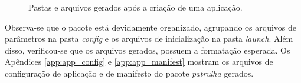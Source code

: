             \begin{figure}[htb]
                \centering
                
                \caption{Pastas e arquivos gerados após a criação de uma aplicação.} \label{fig:patrulha}
            \end{figure}
        
            Observa-se que o pacote está devidamente organizado, agrupando os arquivos de parâmetros na pasta \textit{config} e os arquivos de inicialização na pasta \textit{launch}. Além disso, verificou-se que os arquivos gerados, possuem a formatação esperada. Os Apêndices \ref{app:app_config} e \ref{app:app_manifest} mostram os arquivos de configuração de aplicação e de manifesto do pacote \textit{patrulha} gerados.
        
